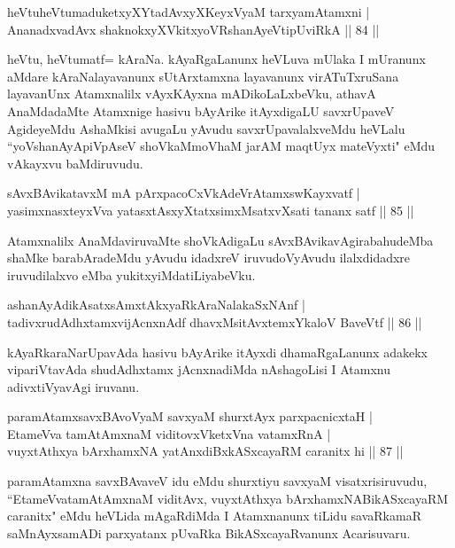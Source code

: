 \begin{shl}
heVtuheVtumaduketxyXYtadAvxyXKeyxVyaM tarxyamAtamxni |\\
AnanadxvadAvx shaknokxyXVkitxyoVR\s shanAyeVtipUviRkA \hfill || 84 ||
\end{shl}

\begin{artha}
heVtu, heVtumatf= kAraNa. kAyaRgaLanunx heVLuva mUlaka I mUranunx aMdare kAraNalayavanunx sUtArxtamxna layavanunx virATuTxruSana layavanUnx Atamxnalilx vAyxKAyxna mADikoLaLxbeVku, athavA AnaMdadaMte Atamxnige hasivu bAyArike itAyxdigaLU savxrUpaveV AgideyeMdu AshaMkisi avugaLu yAvudu savxrUpavalalxveMdu heVLalu ``yoV\s shanAyApiVpAseV shoVkaMmoVhaM jarAM maqtUyx mateVyxti" eMdu vAkayxvu baMdiruvudu.
\end{artha}

\begin{shl}
sAvxBAvikatavxM mA pArxpacoCxVkAdeVrAtamxswKayxvatf |\\
yasimxnasxteyxVva yatasxtAsxyXtatxsimxMsatxvXsati tananx satf \hfill || 85 ||
\end{shl}

\begin{artha}%
Atamxnalilx AnaMdaviruvaMte shoVkAdigaLu sAvxBAvikavAgirabahudeMba shaMke barabAradeMdu yAvudu idadxreV iruvudoV\break yAvudu ilalxdidadxre iruvudilalxvo eMba yukitxyiMda\break tiLiyabeVku.
\end{artha}

\begin{shl}
ashanAyAdikAsatxsAmxtAkxyaRkAraNalakaSxNAnf |\\
tadivxrudAdhxtamxvijAcnxnAdf dhavxMsitAvx\s \s temxYkaloV BaveVtf \hfill || 86 ||
\end{shl}

\begin{artha}
kAyaRkaraNarUpavAda hasivu bAyArike itAyxdi dhamaRgaLanunx adakekx vipariVtavAda shudAdhxtamx jAcnxnadiMda nAshagoLisi I Atamxnu adivxtiVyavAgi iruvanu.
\end{artha}

\begin{shl}
paramAtamxsavxBAvoV\s yaM savxyaM shurxtAyx parxpacnicxtaH |\\
EtameVva tamAtAmxnaM viditovxVketxVna vatamxRnA |\\
vuyxtAthxya bArxhamxNA yatAnxdiBxkASxcayaRM caranitx hi \hfill || 87 ||
\end{shl}

\begin{artha}
paramAtamxna savxBAvaveV idu eMdu shurxtiyu savxyaM visatxrisiruvudu, ``EtameVvatamAtAmxnaM viditAvx, vuyxtAthxya bArxhamxNA\break BikASxcayaRM caranitx" eMdu heVLida mAgaRdiMda I Atamxnanunx tiLidu savaRkamaR saMnAyxsamADi parxyatanx pUvaRka BikASxcayaRvanunx Acarisuvaru.
\end{artha}

